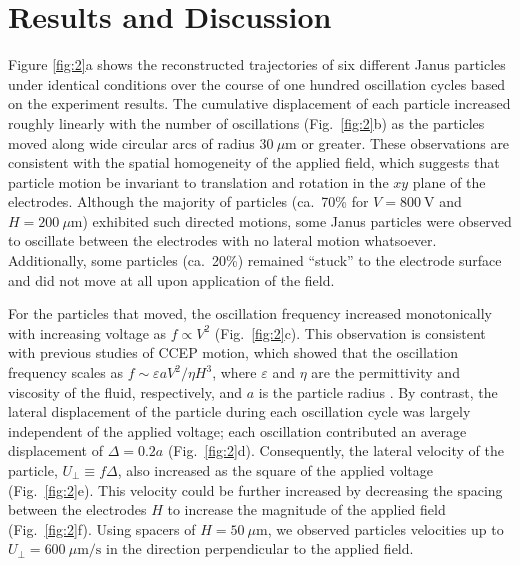 \section{Results and Discussion}

Figure \ref{fig:2}a shows the reconstructed trajectories of six different Janus particles under identical conditions over the course of one hundred oscillation cycles based on the experiment results. 
The cumulative displacement of each particle increased roughly linearly with the number of oscillations (Fig.~\ref{fig:2}b) as the particles moved along wide circular arcs of radius $30~\mu\text{m}$ or greater.
These observations are consistent with the spatial homogeneity of the applied field, which suggests that particle motion be invariant to translation and rotation in the $xy$ plane of the electrodes.
Although the majority of particles (ca.~70\% for $V=800~\text{V}$ and $H=200~\mu\text{m}$) exhibited such directed motions, some Janus particles were observed to oscillate between the electrodes with no lateral motion whatsoever.
Additionally, some particles (ca.~20\%) remained ``stuck'' to the electrode surface and did not move at all upon application of the field.

For the particles that moved, the oscillation frequency increased monotonically with increasing voltage as $f \propto V^{2}$ (Fig.~\ref{fig:2}c).
This observation is consistent with previous studies of CCEP motion, which showed that the oscillation frequency scales as $f\sim\varepsilon a V^2 / \eta H^3$, where $\varepsilon$ and $\eta$ are the permittivity and viscosity of the fluid, respectively, and $a$ is the particle radius \cite{drews2015contact}.
By contrast, the lateral displacement of the particle during each oscillation cycle was largely independent of the applied voltage; each oscillation contributed an average displacement of $\Delta = 0.2 a$ (Fig.~\ref{fig:2}d).
Consequently, the lateral velocity of the particle, $U_{\perp}\equiv f\Delta$, also increased as the square of the applied voltage (Fig.~\ref{fig:2}e).
This velocity could be further increased by decreasing the spacing between the electrodes $H$ to increase the magnitude of the applied field (Fig.~\ref{fig:2}f). 
Using spacers of $H=50~\mu\text{m}$, we observed particles velocities up to $U_{\perp}=600~\mu\text{m/s}$ in the direction perpendicular to the applied field.


